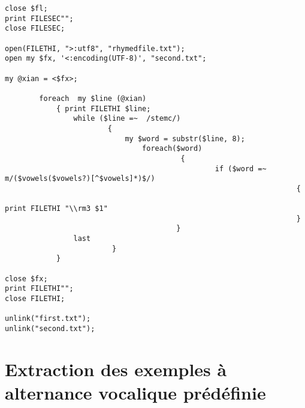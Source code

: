 \documentclass[11pt, a4paper]{book}              %
\begin{document}
\begin{lstlisting}
close $fl;
print FILESEC"";
close FILESEC;

open(FILETHI, ">:utf8", "rhymedfile.txt");
open my $fx, '<:encoding(UTF-8)', "second.txt";

my @xian = <$fx>;

        foreach  my $line (@xian) 
            { print FILETHI $line;
                while ($line =~  /stemc/)
                        {
                            my $word = substr($line, 8);
                                foreach($word)
                                         {  
                                                 if ($word =~  m/($vowels($vowels?)[^$vowels]*)$/)
                                                                    {  
                                                                            print FILETHI "\\rm3 $1" 
                                                                    }
                                        }
                last
                         }
            }
             
close $fx;
print FILETHI"";
close FILETHI;

unlink("first.txt");
unlink("second.txt");

\end{lstlisting}



\section*{Extraction des exemples à alternance vocalique prédéfinie}
\end{document}
